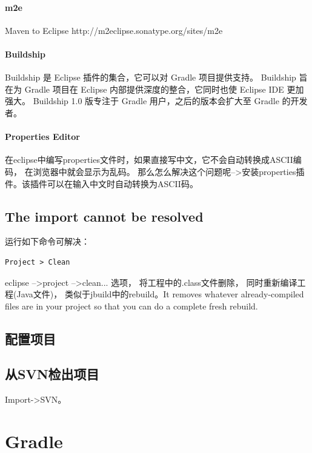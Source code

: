 \documentclass{book}
\begin{document}
\paragraph{m2e}
Maven to Eclipse
http://m2eclipse.sonatype.org/sites/m2e


\paragraph{Buildship}Buildship 是 Eclipse 插件的集合，它可以对 Gradle 项目提供支持。
Buildship 旨在为 Gradle 项目在 Eclipse 内部提供深度的整合，它同时也使 Eclipse IDE 更加强大。
Buildship 1.0 版专注于 Gradle 用户，之后的版本会扩大至 Gradle 的开发者。

\paragraph{Properties Editor}

在eclipse中编写properties文件时，如果直接写中文，它不会自动转换成ASCII编码，
在浏览器中就会显示为乱码。
那么怎么解决这个问题呢-->安装properties插件。该插件可以在输入中文时自动转换为ASCII码。

\subsection{The import cannot be resolved}

运行如下命令可解决：

\begin{lstlisting}
Project > Clean
\end{lstlisting}

eclipse -->project -->clean... 选项， 将工程中的.class文件删除，
同时重新编译工程(Java文件)，
类似于jbuild中的rebuild。It removes whatever already-compiled files 
are in your project so that you can do a complete fresh rebuild.

\subsection{配置项目}

\subsection{从SVN检出项目}

Import->SVN。



\section{Gradle}
\end{document}
